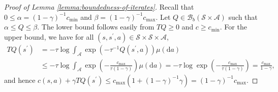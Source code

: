 \documentclass[11pt]{article}
\numberwithin{equation}{section}
\theoremstyle{definition}
\theoremstyle{remark}
\def\diff{{\mathrm{d}}}
\begin{document}
\begin{proof}[Proof of Lemma \ref{lemma:boundedness-of-iterates}]
    Recall that $0 \leq \alpha = (1 - \gamma)^{-1}c_{\min}$ and $\beta = (1 - \gamma)^{-1}c_{\max}$. 
    Let $Q \in \mathcal B_b(\mathcal S \times \mathcal A)$ such that  $\alpha \leq Q  \leq \beta$.
    The lower bound follows easily from $TQ \geq 0$ and $c\ge c_{\min}$.
    For the upper bound, we have for all  $(s,s^\prime,a) \in \mathcal S \times \mathcal S \times \mathcal A$,
    \begin{align*}
        T Q (s^\prime) & = -\tau \log \int_{\mathcal A} \exp \left( - \tau^{-1}Q(s^\prime, a)\right) \mu (\diff a)                                                                           \\
                       & \leq -\tau \log \int_{\mathcal A} \exp \left(- \frac{c_{\max}}{\tau (1 - \gamma)}  \right) \mu (\diff a) = -\tau \log \exp \left(-\frac{c_{\max}}{\tau (1 - \gamma)} \right) = \frac{c_{\max}}{1 - \gamma},
    \end{align*}
    and hence
   $ 
        c(s,a) + \gamma TQ(s^\prime) \leq c_{\max} \left(1 + (1 - \gamma)^{-1}\gamma\right) = (1 - \gamma)^{-1}c_{\max}.
    $     
\end{proof}

 
\end{document}
